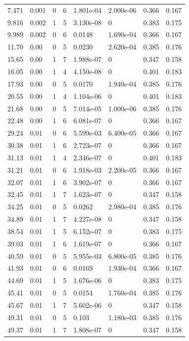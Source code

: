 \documentclass[preview]{standalone}
\begin{document}
{{\begin{tabular}{L{1.2cm}C{1.2cm} C{0.3cm}C{0.5cm} C{1.4cm}C{1.4cm} C{1.4cm}C{1.4cm}}
  7.471  &  0.001  & 0     &  6 &  1.801e-04  & 2.000e-06  & 0.366 &  0.167   \\ 
  9.816  &  0.002  & 1     &  5 &  3.130e-08  & 0  & 0.383 &  0.175   \\ 
  9.989  &  0.002  & 0     &  6 &  0.0148  & 1.690e-04  & 0.366 &  0.167   \\ 
  11.70  &  0.00  & 0     &  5 &  0.0230  & 2.620e-04  & 0.385 &  0.176   \\ 
  15.65  &  0.00  & 1     &  7 &  1.988e-07  & 0  & 0.347 &  0.158   \\ 
  16.05  &  0.00  & 1     &  4 &  4.150e-08  & 0  & 0.401 &  0.183   \\ 
  17.93  &  0.00  & 0     &  5 &  0.0170  & 1.940e-04  & 0.385 &  0.176   \\ 
  20.55  &  0.00  & 1     &  4 &  1.104e-06  & 0  & 0.401 &  0.183   \\ 
  21.68  &  0.00  & 0     &  5 &  7.014e-05  & 1.000e-06  & 0.385 &  0.176   \\ 
  22.48  &  0.00  & 1     &  6 &  6.081e-07  & 0  & 0.366 &  0.167   \\ 
  29.24  &  0.01  & 0     &  6 &  5.599e-03  & 6.400e-05  & 0.366 &  0.167   \\ 
  30.38  &  0.01  & 1     &  6 &  2.723e-07  & 0  & 0.366 &  0.167   \\ 
  31.13  &  0.01  & 1     &  4 &  2.346e-07  & 0  & 0.401 &  0.183   \\ 
  31.21  &  0.01  & 0     &  6 &  1.918e-03  & 2.200e-05  & 0.366 &  0.167   \\ 
  32.07  &  0.01  & 1     &  6 &  3.902e-07  & 0  & 0.366 &  0.167   \\ 
  32.45  &  0.01  & 1     &  7 &  1.623e-07  & 0  & 0.347 &  0.158   \\ 
  34.25  &  0.01  & 0     &  5 &  0.0262  & 2.980e-04  & 0.385 &  0.176   \\ 
  34.89  &  0.01  & 1     &  7 &  4.227e-08  & 0  & 0.347 &  0.158   \\ 
  38.54  &  0.01  & 1     &  5 &  6.152e-07  & 0  & 0.383 &  0.175   \\ 
  39.03  &  0.01  & 1     &  6 &  1.619e-07  & 0  & 0.366 &  0.167   \\ 
  40.59  &  0.01  & 0     &  5 &  5.955e-03  & 6.800e-05  & 0.385 &  0.176   \\ 
  41.93  &  0.01  & 0     &  6 &  0.0169  & 1.930e-04  & 0.366 &  0.167   \\ 
  44.69  &  0.01  & 1     &  5 &  1.676e-06  & 0  & 0.383 &  0.175   \\ 
  45.41  &  0.01  & 0     &  5 &  0.0154  & 1.760e-04  & 0.385 &  0.176   \\ 
  45.67  &  0.01  & 1     &  7 &  5.602e-06  & 0  & 0.347 &  0.158   \\ 
  49.31  &  0.01  & 0     &  5 &  0.103  & 1.180e-03  & 0.385 &  0.176   \\ 
  49.37  &  0.01  & 1     &  7 &  1.808e-07  & 0  & 0.347 &  0.158   \\ 
\hline 
\end{tabular} 

}}
\end{document}
